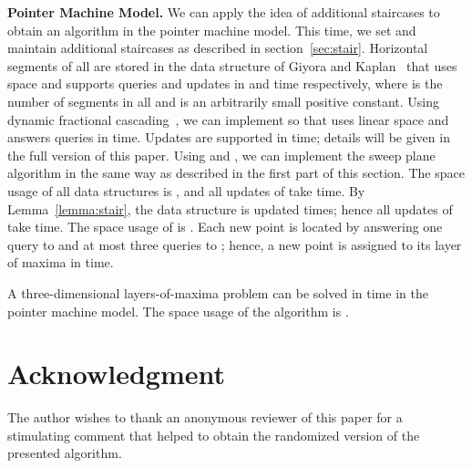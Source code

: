 \documentclass[10pt]{llncs}
\begin{document}
{\bf Pointer Machine Model.}
We can apply the idea of additional staircases to obtain  
an  algorithm in the pointer machine model. This time, we set 
 and maintain additional staircases  as described 
in section~\ref{sec:stair}.
Horizontal  segments of all  are stored in the data 
structure  of Giyora and Kaplan~\cite{GK09} that uses 
 space and
supports queries and updates in  and  
time respectively, where  is the number of segments 
in all  and  is an arbitrarily small  positive constant. 
Using dynamic fractional cascading~\cite{MN90}, we can implement  so that 
 uses linear space and answers queries 
in  time.
Updates are supported in  time; 
details will be given in the 
full version of this paper. 
Using  and , we can implement the 
sweep plane algorithm in the same way as described in the 
first part of this section. The space usage of all data structures 
 is , and all updates of  take  time. 
By Lemma~\ref{lemma:stair}, the data structure  is updated 
 times; hence all updates of  take  time. 
The space usage of  is . 
Each new point is located by answering one query to  and at 
most three queries to ; hence, a new point is assigned 
to its layer of maxima in  time. 
\begin{theorem}
A three-dimensional layers-of-maxima problem can be solved in 
 time in the pointer machine model. The space usage of
 the algorithm is .
\end{theorem}


\section*{Acknowledgment}
The author wishes to thank an anonymous reviewer of this paper for a 
stimulating comment that helped to obtain the randomized version 
of the presented algorithm. 
\end{document}
